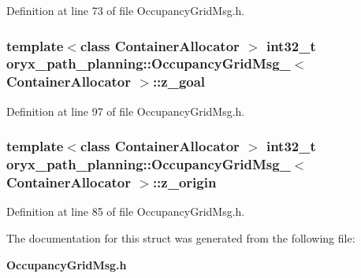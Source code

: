 \-Definition at line 73 of file \-Occupancy\-Grid\-Msg.\-h.

\subsubsection[{z\-\_\-goal}]{\setlength{\rightskip}{0pt plus 5cm}template$<$class Container\-Allocator $>$ int32\-\_\-t {\bf oryx\-\_\-path\-\_\-planning\-::\-Occupancy\-Grid\-Msg\-\_\-}$<$ \-Container\-Allocator $>$\-::{\bf z\-\_\-goal}}\label{structoryx__path__planning_1_1OccupancyGridMsg___abc1dfd42c11c840c8e22c212ad606933}


\-Definition at line 97 of file \-Occupancy\-Grid\-Msg.\-h.

\subsubsection[{z\-\_\-origin}]{\setlength{\rightskip}{0pt plus 5cm}template$<$class Container\-Allocator $>$ int32\-\_\-t {\bf oryx\-\_\-path\-\_\-planning\-::\-Occupancy\-Grid\-Msg\-\_\-}$<$ \-Container\-Allocator $>$\-::{\bf z\-\_\-origin}}\label{structoryx__path__planning_1_1OccupancyGridMsg___a46fbb96a5b16863178f371f0d1eae062}


\-Definition at line 85 of file \-Occupancy\-Grid\-Msg.\-h.



\-The documentation for this struct was generated from the following file\-:\begin{DoxyCompactItemize}
\item 
{\bf \-Occupancy\-Grid\-Msg.\-h}\end{DoxyCompactItemize}
